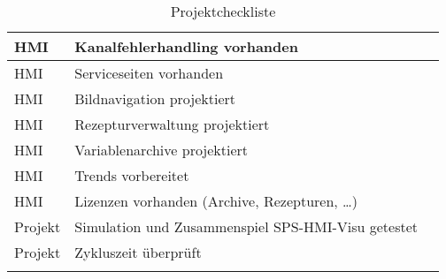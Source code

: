 \begin{longtable}{| p{} | p{} | p{} |}
        HMI & Kanalfehlerhandling vorhanden &  \\
        \hline
        HMI & Serviceseiten vorhanden &  \\
        \hline
        HMI & Bildnavigation projektiert &  \\
        \hline
        HMI & Rezepturverwaltung projektiert &  \\
        \hline
        HMI & Variablenarchive projektiert &  \\
        \hline
        HMI & Trends vorbereitet &  \\
        \hline
        HMI & Lizenzen vorhanden (Archive, Rezepturen, …) &  \\
        \hline
        Projekt & Simulation und Zusammenspiel SPS-HMI-Visu getestet &  \\
        \hline
        Projekt & Zykluszeit überprüft &  \\
        \hline

        \caption{Projektcheckliste}\label{tab:Projektcheckliste} %
    \end{longtable}
